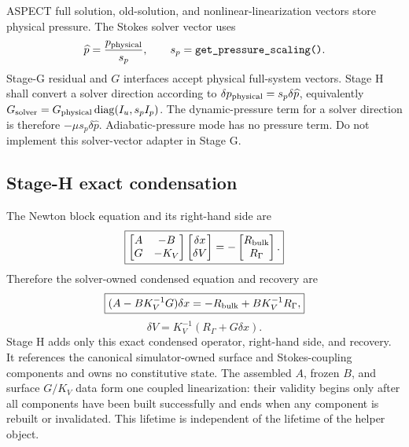 \documentclass[11pt]{article}
\begin{document}
ASPECT full solution, old-solution, and nonlinear-linearization vectors store
physical pressure.  The Stokes solver vector uses
\begin{equation}
 \widehat p=\frac{p_{\rm physical}}{s_p},
 \qquad s_p=\texttt{get\_pressure\_scaling()}.
\end{equation}
Stage-G residual and $G$ interfaces accept physical full-system vectors.
Stage H shall convert a solver direction according to
$\delta p_{\rm physical}=s_p\delta\widehat p$, equivalently
$G_{\rm solver}=G_{\rm physical}\operatorname{diag}(I_u,s_pI_p)$.
The dynamic-pressure term for a solver direction is therefore
$-\mu s_p\delta\widehat p$.  Adiabatic-pressure mode has no pressure term.
Do not implement this solver-vector adapter in Stage G.

\subsection{Stage-H exact condensation}

The Newton block equation and its right-hand side are
\begin{equation}
 \boxed{
 \begin{bmatrix}
  A & -B\\
  G & -K_V
 \end{bmatrix}
 \begin{bmatrix}
  \delta x\\
  \delta V
 \end{bmatrix}
 =-
 \begin{bmatrix}
  R_{\rm bulk}\\
  R_\Gamma
 \end{bmatrix}.}
\end{equation}
Therefore the solver-owned condensed equation and recovery are
\begin{equation}
 \boxed{
 (A-BK_V^{-1}G)\delta x
 =-R_{\rm bulk}+BK_V^{-1}R_\Gamma,}
\end{equation}
\begin{equation}
 \boxed{
 \delta V=K_V^{-1}(R_\Gamma+G\delta x).}
\end{equation}
Stage H adds only this exact condensed operator, right-hand side, and recovery.
It references the canonical simulator-owned surface and Stokes-coupling
components and owns no constitutive state.  The assembled $A$, frozen $B$, and
surface $G/K_V$ data form one coupled linearization: their validity begins only
after all components have been built successfully and ends when any component
is rebuilt or invalidated.  This lifetime is independent of the lifetime of
the helper object.
\end{document}
